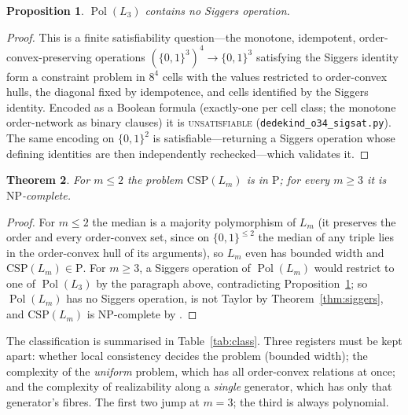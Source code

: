 \documentclass[11pt]{amsart}
\theoremstyle{plain}
\newtheorem{thm}{Theorem}[section]
\newtheorem{prop}[thm]{Proposition}
\theoremstyle{definition}
\DeclareMathOperator{\Pol}{Pol}
\newcommand{\B}{\{0,1\}}
\begin{document}
\begin{prop}\label{prop:nosiggers}
  $\Pol(L_3)$ contains no Siggers operation.
\end{prop}

\begin{proof}
  This is a finite satisfiability question---the monotone, idempotent,
  order-convex-preserving operations $(\B^3)^4\to\B^3$ satisfying the
  Siggers identity form a constraint problem in $8^4$ cells with the
  values restricted to order-convex hulls, the diagonal fixed by
  idempotence, and cells identified by the Siggers identity.  Encoded as
  a Boolean formula (exactly-one per cell class; the monotone
  order-network as binary clauses) it is \textsc{unsatisfiable}
  (\texttt{dedekind\_o34\_sigsat.py}).  The same encoding on $\B^2$ is
  satisfiable---returning a Siggers operation whose defining identities
  are then independently rechecked---which validates it.
\end{proof}

\begin{thm}\label{thm:nphard}
  For $m\le 2$ the problem $\mathrm{CSP}(L_m)$ is in $\mathrm P$; for
  every $m\ge 3$ it is $\mathrm{NP}$-complete.
\end{thm}

\begin{proof}
  For $m\le 2$ the median is a majority polymorphism of $L_m$ (it
  preserves the order and every order-convex set, since on $\B^{\le2}$
  the median of any triple lies in the order-convex hull of its
  arguments), so $L_m$ even has bounded width and $\mathrm{CSP}(L_m)\in
  \mathrm P$.  For $m\ge3$, a Siggers operation of $\Pol(L_m)$ would
  restrict to one of $\Pol(L_3)$ by the paragraph above, contradicting
  Proposition~\ref{prop:nosiggers}; so $\Pol(L_m)$ has no Siggers
  operation, is not Taylor by Theorem~\ref{thm:siggers}, and
  $\mathrm{CSP}(L_m)$ is $\mathrm{NP}$-complete by \cite{Bulatov,Zhuk}.
\end{proof}

The classification is summarised in Table~\ref{tab:class}.  Three
registers must be kept apart: whether local consistency decides the
problem (bounded width); the complexity of the \emph{uniform} problem,
which has all order-convex relations at once; and the complexity of
realizability along a \emph{single} generator, which has only that
generator's fibres.  The first two jump at $m=3$; the third is always
polynomial.
\end{document}
